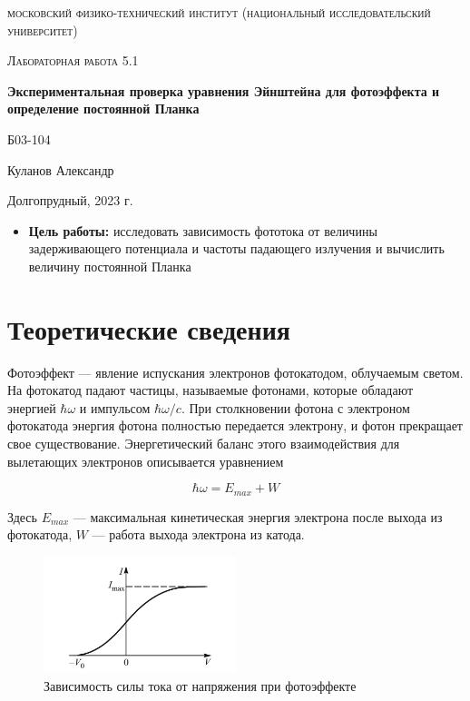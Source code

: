 \documentclass[a4paper, 12pt]{article}
\begin{document}
\begin{titlepage}
	\centering
	\vspace{5cm}
	{\scshape\LARGE московский физико-технический институт (национальный исследовательский университет) \par}
	\vspace{6cm}
	{\scshape\Large Лабораторная работа 5.1 \par}
	{\huge\bfseries Экспериментальная проверка уравнения Эйнштейна для фотоэффекта и определение постоянной Планка \par}
	\vspace{1cm}
	\vfill
\begin{flushright}
	{\large Б03-104}\par
	\vspace{0.3cm}
	{\LARGE Куланов Александр}
\end{flushright}
	

	\vfill


	Долгопрудный, 2023 г.
\end{titlepage}

\begin{itemize}
	\item \textbf{Цель работы:} исследовать зависимость фототока от величины задерживающего потенциала и частоты падающего излучения и вычислить величину постоянной Планка
\end{itemize}

\section{Теоретические сведения}

Фотоэффект --- явление испускания электронов фотокатодом, облучаемым светом. На фотокатод падают частицы, 
называемые фотонами, которые обладают энергией $\hbar \omega$ и импульсом $\hbar\omega/c$. 
При столкновении фотона с электроном фотокатода энергия фотона полностью передается электрону, и фотон прекращает свое существование. Энергетический баланс этого взаимодействия для вылетающих электронов описывается уравнением

\begin{equation}
	\hbar \omega = E_{max} + W
	\label{eq:energy}
\end{equation}

Здесь $ E_{max} $ ---  максимальная кинетическая энергия электрона после выхода из фотокатода, $ W $ --- работа выхода электрона из катода.

\begin{figure}[H]
    \centering
    \includegraphics[width=0.5\textwidth]{VI.jpg}
    \caption{Зависимость силы тока от напряжения при фотоэффекте}
    \label{fig:IV}
\end{figure}
\end{document}
